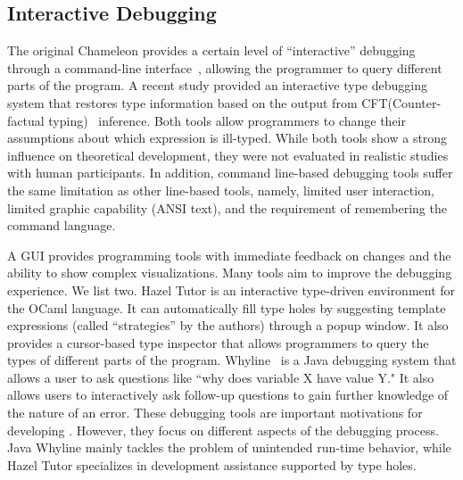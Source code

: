 \subsection{Interactive Debugging}
The original Chameleon provides a certain level of ``interactive'' debugging through a command-line interface~\cite{stuckey_interactive_2003}, allowing the programmer to query different parts of the program. A recent study \cite{tsushima_type_2021} provided an interactive type debugging system that restores type information based on the output from CFT(Counter-factual typing)~\cite{chen_counter-factual_2014, chen_efficient_2020, chen_improving_2022} inference.  Both tools allow programmers to change their assumptions about which expression is ill-typed. While both tools show a strong influence on theoretical development, they were not evaluated in realistic studies with human participants. In addition, command line-based debugging tools suffer the same limitation as other line-based tools, namely, limited user interaction, limited graphic capability (ANSI text), and the requirement of remembering the command language. 

A GUI provides programming tools with immediate feedback on changes and the ability to show complex visualizations. Many tools aim to improve the debugging experience. We list two. Hazel Tutor \cite{potter_hazel_2020} is an interactive type-driven environment for the OCaml language. It can automatically fill type holes by suggesting template expressions (called ``strategies'' by the authors) through a popup window. It also provides a cursor-based type inspector that allows programmers to query the types of different parts of the program. Whyline~\cite{ko_finding_2009} is a Java debugging system that allows a user to ask questions like ``why does variable X have value Y." It also allows users to interactively ask follow-up questions to gain further knowledge of the nature of an error. These debugging tools are important motivations for developing \chameleon{}. However, they focus on different aspects of the debugging process. Java Whyline mainly tackles the problem of unintended run-time behavior, while Hazel Tutor specializes in development assistance supported by type holes.





